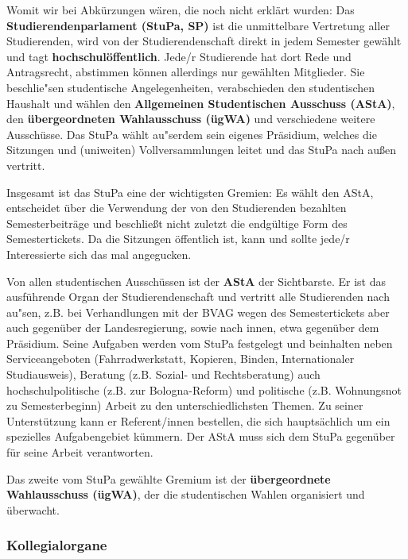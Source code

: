 Womit wir bei Abkürzungen wären, die noch nicht erklärt wurden: Das \textbf{Studierendenparlament (StuPa, SP)} ist die 
unmittelbare Vertretung aller Studierenden, wird von der Studierendenschaft 
direkt in jedem Semester gewählt und tagt \textbf{hochschulöffentlich}.
Jede/r Studierende hat dort Rede und Antragsrecht, abstimmen können allerdings nur 
gewählten Mitglieder. Sie beschlie"sen studentische Angelegenheiten, verabschieden den studentischen 
Haushalt und wählen den \textbf{Allgemeinen Studentischen Ausschuss (AStA)},
den \textbf{übergeordneten Wahlausschuss (ügWA)}
und verschiedene weitere Ausschüsse. Das StuPa wählt au"serdem sein eigenes
Präsidium, welches die Sitzungen und (uniweiten) Vollversammlungen leitet und
das StuPa nach außen  vertritt.  

Insgesamt ist das StuPa eine der wichtigsten Gremien: Es wählt den AStA, entscheidet über die Verwendung der von den Studierenden bezahlten Semesterbeiträge 
und beschließt nicht zuletzt die endgültige Form des Semestertickets. 
Da die Sitzungen öffentlich ist, kann und sollte jede/r Interessierte sich das mal angegucken.

Von allen studentischen Ausschüssen ist der \textbf{AStA}  der
Sichtbarste. Er ist das ausführende Organ der 
Studierendenschaft und vertritt alle Studierenden nach au"sen, z.B. bei 
Verhandlungen mit der BVAG wegen des Semestertickets aber auch gegenüber der 
Landesregierung, sowie nach innen, etwa gegenüber dem Präsidium. Seine Aufgaben werden vom 
StuPa festgelegt und beinhalten neben Serviceangeboten (Fahrradwerkstatt, Kopieren, Binden, 
Internationaler Studiausweis), Beratung (z.B. Sozial- und Rechtsberatung) auch hochschulpolitische 
(z.B. zur Bologna-Reform) und politische (z.B. Wohnungsnot zu Semesterbeginn) Arbeit zu den 
unterschiedlichsten Themen. Zu seiner Unterstützung kann er Referent/innen 
bestellen, die sich hauptsächlich um ein spezielles Aufgabengebiet kümmern.
Der AStA muss sich dem StuPa gegenüber für seine Arbeit verantworten.

Das zweite vom StuPa gewählte Gremium ist der \textbf{übergeordnete 
Wahlausschuss (ügWA)}, der die studentischen Wahlen organisiert und überwacht.

\subsubsection*{Kollegialorgane}

